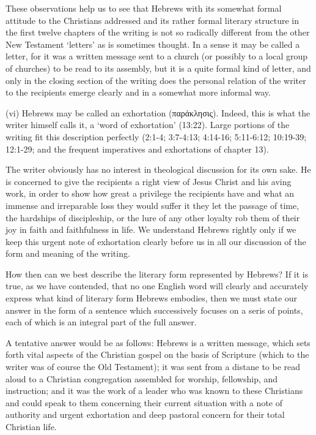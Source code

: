 These observations help us to see that Hebrews with its somewhat formal attitude
to the Christians addressed and its rather formal literary structure in the
first twelve chapters of the writing is not so radically different from the
other New Testament `letters' as is sometimes thought.
In a sense it may be called a letter, for it was a written message sent to a
church (or possibly to a local group of churches) to be read to its assembly,
but it is a quite formal kind of letter, and only in the closing section of the
writing does the personal relation of the writer to the recipients emerge
clearly and in a somewhat more informal way.

(vi) Hebrews may be called an exhortation (παρἀκλησις).
Indeed, this is what the writer himself calls it, a `word of exhortation'
(13:22).
Large portions of the writing fit this description perfectly (2:1-4; 3:7-4:13;
4:14-16; 5:11-6:12; 10:19-39; 12:1-29; and the frequent imperatives and
exhortations of chapter 13).

The writer obviously has no interest in theological discussion for its own sake.
He is concerned to give the recipients a right view of Jesus Christ and his
aving work, in order to show how great a privilege the recipients have and what
an immense and irreparable loss they would suffer it they let the passage of
time, the hardships of discipleship, or the lure of any other loyalty rob them
of their joy in faith and faithfulness in life.
We understand Hebrews rightly only if we keep this urgent note of exhortation
clearly before us in all our discussion of the form and meaning of the writing.

How then can we best describe the literary form represented by Hebrews?
If it is true, as we have contended, that no one English word will clearly and
accurately express what kind of literary form Hebrews embodies, then we must
state our answer in the form of a sentence which successively focuses on a seris
of points, each of which is an integral part of the full answer.

A tentative answer would be as follows: Hebrews is a written message, which sets
forth vital aspects of the Christian gospel on the basis of Scripture (which to
the writer was of course the Old Testament); it was sent from a distane to be
read aloud to a Christian congregation assembled for worship, fellowship, and
instruction; and it was the work of a leader who was known to these Christians
and could speak to them concerning their current situation with a note of
authority and urgent exhortation and deep pastoral concern for their total
Christian life.
